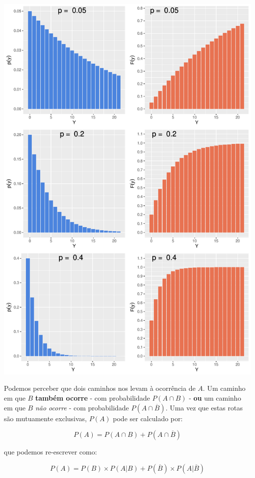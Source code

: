 \documentclass[
]{book}
\begin{document}
\begin{center}\includegraphics{probest-cambientais_files/figure-latex/unnamed-chunk-199-1} \end{center}

Podemos perceber que dois caminhos nos levam à ocorrência de \(A\). Um caminho em que \(B\) \textbf{também ocorre} - com probabilidade \(P(A \cap B)\) - \textbf{ou} um caminho em que \(B\) \emph{não ocorre} - com probabilidade \(P(A \cap \overline{B})\). Uma vez que estas rotas são mutuamente exclusivas, \(P(A)\) pode ser calculado por:

\[P(A) = P(A \cap B) + P(A \cap \overline{B})\]

que podemos re-escrever como:

\[P(A) = P(B) \times P(A|B) + P(\overline{B}) \times P(A|\overline{B})\]
\end{document}
